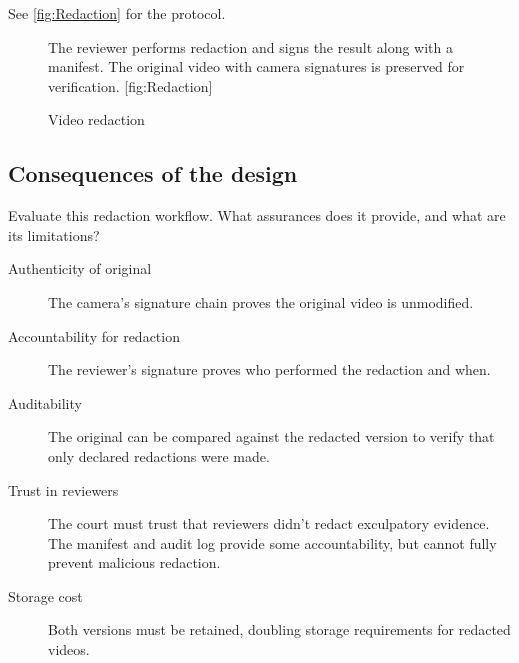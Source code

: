 See \cref{fig:Redaction} for the protocol.

\begin{figure}
  \begin{sidecaption}{%
    The reviewer performs redaction and signs the result along with a manifest.
    The original video with camera signatures is preserved for verification.
  }[fig:Redaction]
  \flushright
  \begin{msc}
    [/msc/action width=0.4\linewidth]
    {Video redaction}
      \nextlevel[2]
      \nextlevel[4]
      \nextlevel[2]
      \nextlevel
      \nextlevel
  \end{msc}
  \end{sidecaption}
\end{figure}

\subsection{Consequences of the design}

\begin{exercise}
  Evaluate this redaction workflow.
  What assurances does it provide, and what are its limitations?
\end{exercise}

\begin{description}
  \item[Authenticity of original] The camera's signature chain proves the 
    original video is unmodified.
  \item[Accountability for redaction] The reviewer's signature proves who 
    performed the redaction and when.
  \item[Auditability] The original can be compared against the redacted version 
    to verify that only declared redactions were made.
  \item[Trust in reviewers] The court must trust that reviewers didn't redact 
    exculpatory evidence.
    The manifest and audit log provide some accountability, but cannot fully 
    prevent malicious redaction.
  \item[Storage cost] Both versions must be retained, doubling storage 
    requirements for redacted videos.
\end{description}


